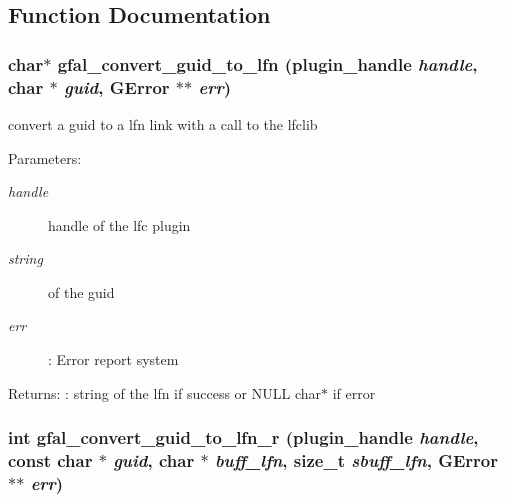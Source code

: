 \subsection{Function Documentation}
\subsubsection{\setlength{\rightskip}{0pt plus 5cm}char$\ast$ gfal\_\-convert\_\-guid\_\-to\_\-lfn (plugin\_\-handle {\em handle}, char $\ast$ {\em guid}, GError $\ast$$\ast$ {\em err})}\label{lfc__ifce__ng_8c_4bfe1a660a34d4e1e8a5d220ee256ff5}


convert a guid to a lfn link with a call to the lfclib \begin{Desc}
\item[Parameters:]
\begin{description}
\item[{\em handle}]handle of the lfc plugin \item[{\em string}]of the guid \item[{\em err}]: Error report system \end{description}
\end{Desc}
\begin{Desc}
\item[Returns:]: string of the lfn if success or NULL char$\ast$ if error \end{Desc}
\subsubsection{\setlength{\rightskip}{0pt plus 5cm}int gfal\_\-convert\_\-guid\_\-to\_\-lfn\_\-r (plugin\_\-handle {\em handle}, const char $\ast$ {\em guid}, char $\ast$ {\em buff\_\-lfn}, size\_\-t {\em sbuff\_\-lfn}, GError $\ast$$\ast$ {\em err})}\label{lfc__ifce__ng_8c_70f8470c60821b33776b4504d6bb4610}


